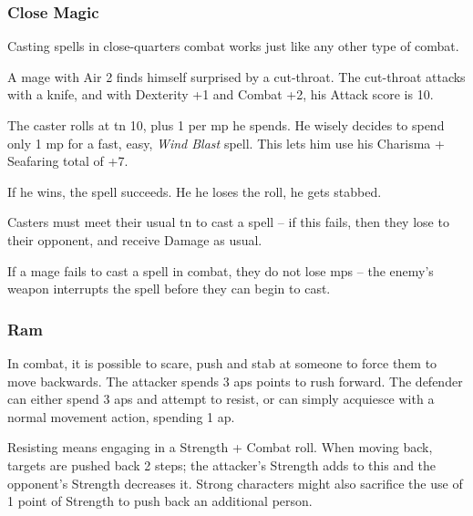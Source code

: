 \begin{multicols}{2}
\subsubsection[Close Magic: Casters roll vs the enemy's standard Attack score]{Close Magic}

Casting spells in close-quarters combat works just like any other type of combat.

\begin{exampletext}
  A mage with Air 2 finds himself surprised by a cut-throat.
  The cut-throat attacks with a knife, and with Dexterity +1 and Combat +2, his Attack score is 10.

  The caster rolls at \gls{tn} 10, plus 1 per \gls{mp} he spends.
  He wisely decides to spend only 1 \gls{mp} for a fast, easy, \textit{Wind Blast} spell.
  This lets him use his Charisma + Seafaring total of +7.

  If he wins, the spell succeeds.
  He he loses the roll, he gets stabbed.
\end{exampletext}

Casters must meet their usual \gls{tn} to cast a spell -- if this fails, then they lose to their opponent, and receive Damage as usual.

If a mage fails to cast a spell in combat, they do not lose \glspl{mp} -- the enemy's weapon interrupts the spell before they can begin to cast.

\subsubsection[Ram: Push the enemy back 2 steps plus the difference between your Strength Bonuses. Resisting costs 2 \glspl{ap}, and requires a resisted Strength + Combat roll. Cost: 3 \glspl{ap}]{Ram}
\label{ram}

In combat, it is possible to scare, push and stab at someone to force them to move backwards.
The attacker spends 3 \glspl{ap} points to rush forward.
The defender can either spend 3 \glspl{ap} and attempt to resist, or can simply acquiesce with a normal movement action, spending 1 \gls{ap}.

Resisting means engaging in a Strength + Combat roll.
When moving back, targets are pushed back 2 steps; the attacker's Strength adds to this and the opponent's Strength decreases it.
Strong characters might also sacrifice the use of 1 point of Strength to push back an additional person.


\end{multicols}
